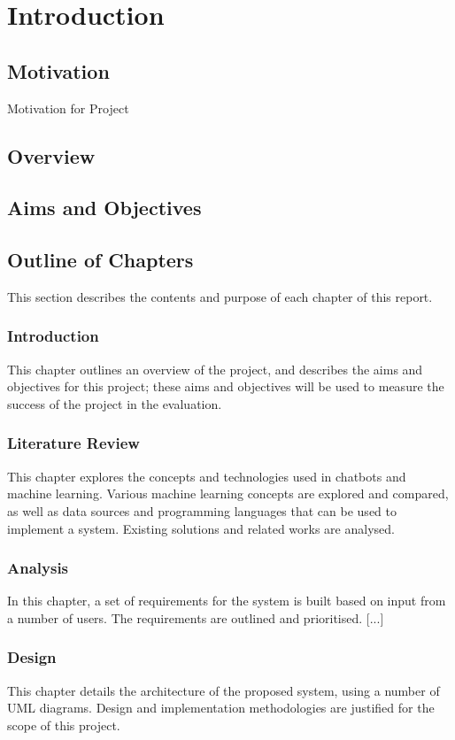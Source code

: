 \chapter{Introduction}
\section{Motivation}
Motivation for Project

\section{Overview}

\section{Aims and Objectives}

\newpage
\section{Outline of Chapters}
This section describes the contents and purpose of each chapter of this report.

\subsection*{Introduction}
This chapter outlines an overview of the project, and describes the aims and objectives for this project; these aims and objectives will be used to measure the success of the project in the evaluation.

\subsection*{Literature Review}
This chapter explores the concepts and technologies used in chatbots and machine learning. Various machine learning concepts are explored and compared, as well as data sources and programming languages that can be used to implement a system. Existing solutions and related works are analysed.

\subsection*{Analysis}
In this chapter, a set of requirements for the system is built based on input from a number of users. The requirements are outlined and prioritised. [...] 

\subsection*{Design}
This chapter details the architecture of the proposed system, using a number of UML diagrams. Design and implementation methodologies are justified for the scope of this project.

